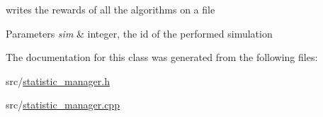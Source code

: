 writes the rewards of all the algorithms on a file 


\begin{DoxyParams}{Parameters}
{\em sim} & integer, the id of the performed simulation \\
\hline
\end{DoxyParams}


The documentation for this class was generated from the following files\+:\begin{DoxyCompactItemize}
\item 
src/\mbox{\hyperlink{statistic__manager_8h}{statistic\+\_\+manager.\+h}}\item 
src/\mbox{\hyperlink{statistic__manager_8cpp}{statistic\+\_\+manager.\+cpp}}\end{DoxyCompactItemize}

